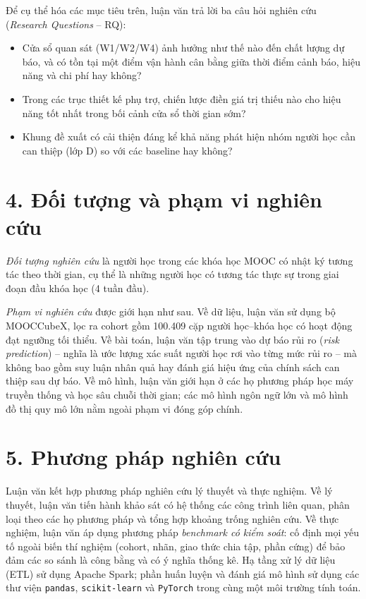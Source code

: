 Để cụ thể hóa các mục tiêu trên, luận văn trả lời ba câu hỏi nghiên cứu (\textit{Research Questions} -- RQ):

\begin{itemize}[leftmargin=1.2cm,topsep=3pt]
  \item[\textbf{RQ1.}] Cửa sổ quan sát (W1/W2/W4) ảnh hưởng như thế nào đến chất lượng dự báo, và có tồn tại một điểm vận hành cân bằng giữa thời điểm cảnh báo, hiệu năng và chi phí hay không?
  \item[\textbf{RQ2.}] Trong các trục thiết kế phụ trợ, chiến lược điền giá trị thiếu nào cho hiệu năng tốt nhất trong bối cảnh cửa sổ thời gian sớm?
  \item[\textbf{RQ3.}] Khung đề xuất có cải thiện đáng kể khả năng phát hiện nhóm người học cần can thiệp (lớp D) so với các baseline hay không?
\end{itemize}

\section*{4. Đối tượng và phạm vi nghiên cứu}

\textit{Đối tượng nghiên cứu} là người học trong các khóa học MOOC có nhật ký tương tác theo thời gian, cụ thể là những người học có tương tác thực sự trong giai đoạn đầu khóa học (4 tuần đầu).

\textit{Phạm vi nghiên cứu} được giới hạn như sau. Về dữ liệu, luận văn sử dụng bộ MOOCCubeX, lọc ra cohort gồm 100.409 cặp người học--khóa học có hoạt động đạt ngưỡng tối thiểu. Về bài toán, luận văn tập trung vào dự báo rủi ro (\textit{risk prediction}) -- nghĩa là ước lượng xác suất người học rơi vào từng mức rủi ro -- mà không bao gồm suy luận nhân quả hay đánh giá hiệu ứng của chính sách can thiệp sau dự báo. Về mô hình, luận văn giới hạn ở các họ phương pháp học máy truyền thống và học sâu chuỗi thời gian; các mô hình ngôn ngữ lớn và mô hình đồ thị quy mô lớn nằm ngoài phạm vi đóng góp chính.

\section*{5. Phương pháp nghiên cứu}

Luận văn kết hợp phương pháp nghiên cứu lý thuyết và thực nghiệm. Về lý thuyết, luận văn tiến hành khảo sát có hệ thống các công trình liên quan, phân loại theo các họ phương pháp và tổng hợp khoảng trống nghiên cứu. Về thực nghiệm, luận văn áp dụng phương pháp \textit{benchmark có kiểm soát}: cố định mọi yếu tố ngoài biến thí nghiệm (cohort, nhãn, giao thức chia tập, phần cứng) để bảo đảm các so sánh là công bằng và có ý nghĩa thống kê. Hạ tầng xử lý dữ liệu (ETL) sử dụng Apache Spark; phần huấn luyện và đánh giá mô hình sử dụng các thư viện \texttt{pandas}, \texttt{scikit-learn} và \texttt{PyTorch} trong cùng một môi trường tính toán.

